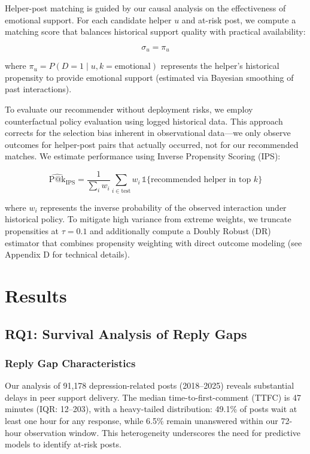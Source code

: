 \documentclass[letterpaper]{article} %
\begin{document}
Helper-post matching is guided by our causal analysis on the effectiveness of emotional support. For each candidate helper $u$ and at-risk post, we compute a matching score that balances historical support quality with practical availability:

\begin{equation}
\sigma_u = \pi_u 
\end{equation}

where $\pi_u = P(D=1 \mid u, k=\text{emotional})$ represents the helper's historical propensity to provide emotional support (estimated via Bayesian smoothing of past interactions). 

To evaluate our recommender without deployment risks, we employ counterfactual policy evaluation using logged historical data. This approach corrects for the selection bias inherent in observational data—we only observe outcomes for helper-post pairs that actually occurred, not for our recommended matches. We estimate performance using Inverse Propensity Scoring (IPS):

\begin{equation}
\widehat{\text{P@k}}_\text{IPS} = \frac{1}{\sum_i w_i}\sum_{i\in\text{test}} w_i\,\mathbb{1}\{\text{recommended helper in top }k\}
\end{equation}

where $w_i$ represents the inverse probability of the observed interaction under historical policy. To mitigate high variance from extreme weights, we truncate propensities at $\tau=0.1$ and additionally compute a Doubly Robust (DR) estimator that combines propensity weighting with direct outcome modeling (see Appendix D for technical details).


\section{Results}

\subsection{RQ1: Survival Analysis of Reply Gaps}

\subsubsection{Reply Gap Characteristics}

Our analysis of 91,178 depression-related posts (2018–2025) reveals substantial delays in peer support delivery. The median time-to-first-comment (TTFC) is 47 minutes (IQR: 12–203), with a heavy-tailed distribution: 49.1\% of posts wait at least one hour for any response, while 6.5\% remain unanswered within our 72-hour observation window. This heterogeneity underscores the need for predictive models to identify at-risk posts.
\end{document}
